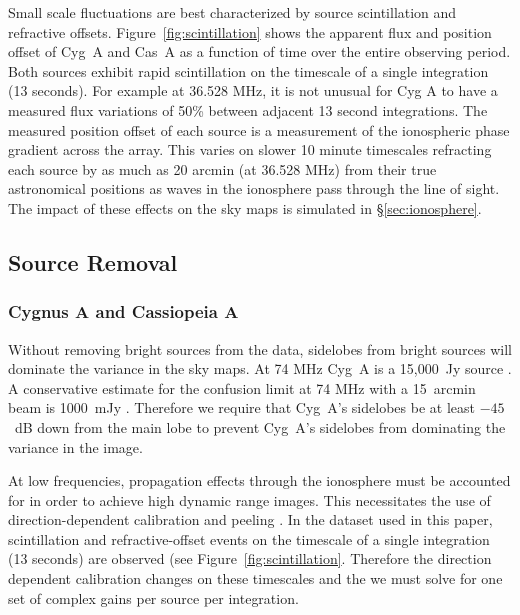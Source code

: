\documentclass[twocolumn]{aastex61}
\begin{document}
Small scale fluctuations are best characterized by source scintillation and refractive offsets.
Figure~\ref{fig:scintillation} shows the apparent flux and position offset of Cyg~A and Cas~A as a
function of time over the entire observing period. Both sources exhibit rapid scintillation on the
timescale of a single integration (13 seconds). For example at 36.528 MHz, it is not unusual for Cyg
A to have a measured flux variations of 50\% between adjacent 13 second integrations.  The measured
position offset of each source is a measurement of the ionospheric phase gradient across the array.
This varies on slower 10 minute timescales refracting each source by as much as 20 arcmin (at 36.528
MHz) from their true astronomical positions as waves in the ionosphere pass through the line of
sight. The impact of these effects on the sky maps is simulated in \S\ref{sec:ionosphere}.

\subsection{Source Removal}\label{sec:source-removal}

\subsubsection{Cygnus A and Cassiopeia A}

Without removing bright sources from the data, sidelobes from bright sources will dominate the
variance in the sky maps.  At 74 MHz Cyg~A is a 15,000~Jy source \citep{1977A&A....61...99B}. A
conservative estimate for the confusion limit at 74 MHz with a 15~arcmin beam is 1000~mJy
\citep{2014MNRAS.440..327L}. Therefore we require that Cyg~A's sidelobes be at least $-45$~dB down
from the main lobe to prevent Cyg~A's sidelobes from dominating the variance in the image.

At low frequencies, propagation effects through the ionosphere must be accounted for in order to
achieve high dynamic range images. This necessitates the use of direction-dependent calibration and
peeling \citep{2008ISTSP...2..707M, 2015MNRAS.449.2668S}.  In the dataset used in this paper,
scintillation and refractive-offset events on the timescale of a single integration (13 seconds) are
observed (see Figure~\ref{fig:scintillation}. Therefore the direction dependent calibration changes
on these timescales and the we must solve for one set of complex gains per source per integration.
\end{document}
